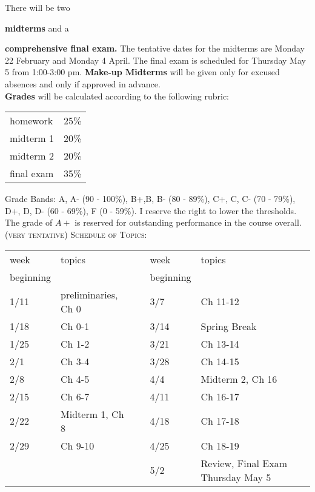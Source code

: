 \documentclass[11pt]{article}
\begin{document}
There will be two {\textbf{midterms} and a {\textbf{comprehensive final exam.} The tentative dates for the midterms are Monday 22 February and Monday 4 April. The final exam is scheduled for Thursday May 5 from 1:00-3:00 pm. \textbf{Make-up Midterms} will be given only for excused absences and only if approved in advance.\\


\textbf{Grades} will be calculated according to the following rubric:
\begin{tabular}{|l|c|}
  \hline
  homework & 25\% \\
  midterm 1 & 20\% \\
  midterm 2 & 20\%\\
  final exam & 35\% \\
  \hline
\end{tabular}

Grade Bands: A, A- (90 - 100\%), B+,B, B- (80 - 89\%), C+, C, C- (70 - 79\%), D+, D, D-
(60 - 69\%), F (0 - 59\%).  I reserve the right to lower the thresholds. The grade of $A+$ is reserved for outstanding performance in the course overall.\\

\textsc{(very tentative) Schedule of Topics:}

\begin{tabular}{|l|l|l|l|l|}
  \hline
  week  & topics &  & week & topics \\
  beginning&&&beginning&\\
  \hline
  1/11 & preliminaries,  Ch 0 &  & 3/7 & Ch 11-12\\
  1/18 & Ch 0-1 &  & 3/14& Spring Break \\
  1/25 & Ch 1-2 &  & 3/21 & Ch 13-14\\
  2/1 & Ch 3-4&  & 3/28 & Ch 14-15\\
  2/8& Ch 4-5 &  & 4/4 & Midterm 2, Ch 16\\
  2/15 & Ch 6-7 &  & 4/11& Ch 16-17 \\
  2/22 & Midterm 1, Ch 8 &  &4/18& Ch 17-18\\
  2/29 & Ch 9-10 &  &   4/25 &  Ch 18-19 \\
   &&&5/2 & Review, Final Exam Thursday May 5 \\
  \hline
\end{tabular}


}}
\end{document}
